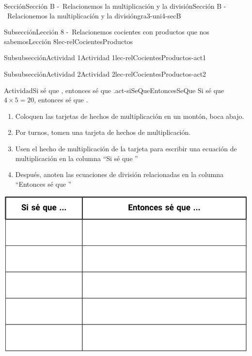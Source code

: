 \begin{sectionptx}{Sección}{Sección B -~Relacionemos la multiplicación y la división}{}{Sección B -~Relacionemos la multiplicación y la división}{}{}{gra3-uni4-secB}
\begin{subsectionptx}{Subsección}{Lección 8 -~Relacionemos cocientes con productos que nos sabemos}{}{Lección 8}{}{}{lec-relCocientesProductos}
\begin{subsubsectionptx}{Subsubsección}{Actividad 1}{}{Actividad 1}{}{}{lec-relCocientesProductos-act1}
\end{subsubsectionptx}
%
%
\typeout{************************************************}
\typeout{************************************************}
%
\begin{subsubsectionptx}{Subsubsección}{Actividad 2}{}{Actividad 2}{}{}{lec-relCocientesProductos-act2}
\begin{activity}{Actividad}{Si sé que \textellipsis{}, entonces sé que \textellipsis{}.}{act-siSeQueEntoncesSeQue}%
Si sé que \(4 \times 5 = 20\), entonces sé que .%
%
\begin{enumerate}
\item{}Coloquen las tarjetas de hechos de multiplicación en un montón, boca abajo.%
\item{}Por turnos, tomen una tarjeta de hechos de multiplicación.%
\item{}Usen el hecho de multiplicación de la tarjeta para escribir una ecuación de multiplicación en la columna “Si sé que \textellipsis{}”%
\item{}Después, anoten las ecuaciones de división relacionadas en la columna “Entonces sé que   \textellipsis{}”%
\end{enumerate}
\begin{image}{0}{1}{0}{}%
\includegraphics[max width=\linewidth, center]{external/tikz-source/siSeQueEntoncesSeQue-tab-libroTrabajo.pdf}
\end{image}%
\end{activity}%
\end{subsubsectionptx}
%
%
\typeout{************************************************}
\typeout{************************************************}

\end{subsectionptx}
\end{sectionptx}
